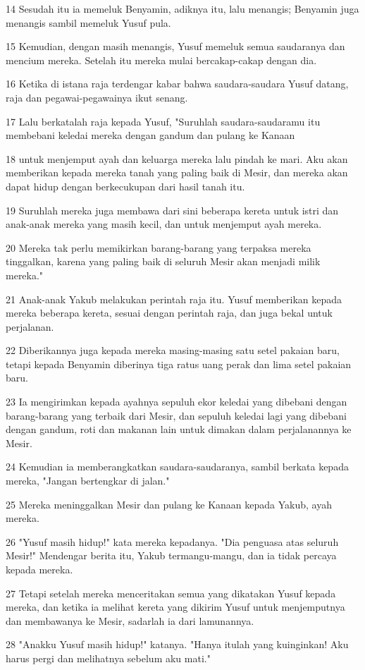 \par 14 Sesudah itu ia memeluk Benyamin, adiknya itu, lalu menangis; Benyamin juga menangis sambil memeluk Yusuf pula.
\par 15 Kemudian, dengan masih menangis, Yusuf memeluk semua saudaranya dan mencium mereka. Setelah itu mereka mulai bercakap-cakap dengan dia.
\par 16 Ketika di istana raja terdengar kabar bahwa saudara-saudara Yusuf datang, raja dan pegawai-pegawainya ikut senang.
\par 17 Lalu berkatalah raja kepada Yusuf, "Suruhlah saudara-saudaramu itu membebani keledai mereka dengan gandum dan pulang ke Kanaan
\par 18 untuk menjemput ayah dan keluarga mereka lalu pindah ke mari. Aku akan memberikan kepada mereka tanah yang paling baik di Mesir, dan mereka akan dapat hidup dengan berkecukupan dari hasil tanah itu.
\par 19 Suruhlah mereka juga membawa dari sini beberapa kereta untuk istri dan anak-anak mereka yang masih kecil, dan untuk menjemput ayah mereka.
\par 20 Mereka tak perlu memikirkan barang-barang yang terpaksa mereka tinggalkan, karena yang paling baik di seluruh Mesir akan menjadi milik mereka."
\par 21 Anak-anak Yakub melakukan perintah raja itu. Yusuf memberikan kepada mereka beberapa kereta, sesuai dengan perintah raja, dan juga bekal untuk perjalanan.
\par 22 Diberikannya juga kepada mereka masing-masing satu setel pakaian baru, tetapi kepada Benyamin diberinya tiga ratus uang perak dan lima setel pakaian baru.
\par 23 Ia mengirimkan kepada ayahnya sepuluh ekor keledai yang dibebani dengan barang-barang yang terbaik dari Mesir, dan sepuluh keledai lagi yang dibebani dengan gandum, roti dan makanan lain untuk dimakan dalam perjalanannya ke Mesir.
\par 24 Kemudian ia memberangkatkan saudara-saudaranya, sambil berkata kepada mereka, "Jangan bertengkar di jalan."
\par 25 Mereka meninggalkan Mesir dan pulang ke Kanaan kepada Yakub, ayah mereka.
\par 26 "Yusuf masih hidup!" kata mereka kepadanya. "Dia penguasa atas seluruh Mesir!" Mendengar berita itu, Yakub termangu-mangu, dan ia tidak percaya kepada mereka.
\par 27 Tetapi setelah mereka menceritakan semua yang dikatakan Yusuf kepada mereka, dan ketika ia melihat kereta yang dikirim Yusuf untuk menjemputnya dan membawanya ke Mesir, sadarlah ia dari lamunannya.
\par 28 "Anakku Yusuf masih hidup!" katanya. "Hanya itulah yang kuinginkan! Aku harus pergi dan melihatnya sebelum aku mati."

